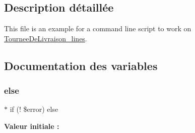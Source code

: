 \subsection{Description détaillée}
This file is an example for a command line script to work on \hyperlink{classTourneeDeLivraison__lines}{Tournee\+De\+Livraison\+\_\+lines}. 



\subsection{Documentation des variables}
\mbox{\label{tourneedelivraison__lines_8php_a7b6906d90f668055f3c8e8b2ae497513}} 
\subsubsection{\texorpdfstring{else}{else}}
{\footnotesize\ttfamily $\ast$ if (! \$error) else}

{\bfseries Valeur initiale \+:}
